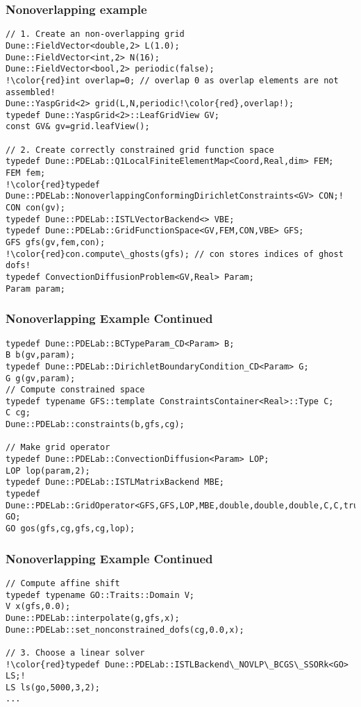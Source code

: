 \begin{frame}[fragile]
  \frametitle{Nonoverlapping example}
  \begin{lstlisting}[breaklines=true,escapechar=!]
// 1. Create an non-overlapping grid
Dune::FieldVector<double,2> L(1.0);
Dune::FieldVector<int,2> N(16);
Dune::FieldVector<bool,2> periodic(false);
!\color{red}int overlap=0; // overlap 0 as overlap elements are not assembled!
Dune::YaspGrid<2> grid(L,N,periodic!\color{red},overlap!);
typedef Dune::YaspGrid<2>::LeafGridView GV;
const GV& gv=grid.leafView();

// 2. Create correctly constrained grid function space
typedef Dune::PDELab::Q1LocalFiniteElementMap<Coord,Real,dim> FEM;
FEM fem;
!\color{red}typedef Dune::PDELab::NonoverlappingConformingDirichletConstraints<GV> CON;!
CON con(gv);
typedef Dune::PDELab::ISTLVectorBackend<> VBE;
typedef Dune::PDELab::GridFunctionSpace<GV,FEM,CON,VBE> GFS;
GFS gfs(gv,fem,con);
!\color{red}con.compute\_ghosts(gfs); // con stores indices of ghost dofs!
typedef ConvectionDiffusionProblem<GV,Real> Param;
Param param;
\end{lstlisting}
\end{frame}
\begin{frame}[fragile]
\frametitle<presentation>{Nonoverlapping Example Continued}
  \begin{lstlisting}[breaklines=true]
typedef Dune::PDELab::BCTypeParam_CD<Param> B;
B b(gv,param);
typedef Dune::PDELab::DirichletBoundaryCondition_CD<Param> G;
G g(gv,param);
// Compute constrained space
typedef typename GFS::template ConstraintsContainer<Real>::Type C;
C cg;
Dune::PDELab::constraints(b,gfs,cg);

// Make grid operator
typedef Dune::PDELab::ConvectionDiffusion<Param> LOP;
LOP lop(param,2);
typedef Dune::PDELab::ISTLMatrixBackend MBE;
typedef Dune::PDELab::GridOperator<GFS,GFS,LOP,MBE,double,double,double,C,C,true> GO;
GO gos(gfs,cg,gfs,cg,lop);
\end{lstlisting}
\end{frame}
\begin{frame}[fragile]
\frametitle<presentation>{Nonoverlapping Example Continued}
  \begin{lstlisting}[breaklines=true,escapechar=!]
// Compute affine shift
typedef typename GO::Traits::Domain V;
V x(gfs,0.0);
Dune::PDELab::interpolate(g,gfs,x);
Dune::PDELab::set_nonconstrained_dofs(cg,0.0,x);

// 3. Choose a linear solver
!\color{red}typedef Dune::PDELab::ISTLBackend\_NOVLP\_BCGS\_SSORk<GO> LS;!
LS ls(go,5000,3,2);
...
\end{lstlisting}

\end{frame}



